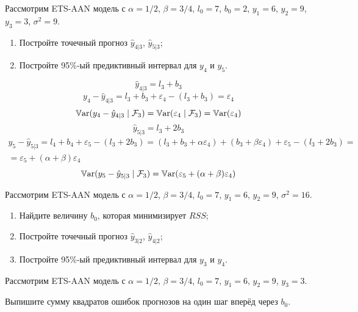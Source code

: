 \begin{problem}
  Рассмотрим ETS-AAN модель с $\alpha = 1/2$, $\beta=3/4$, $l_{0}=7$, $b_0=2$, $y_1=6$, $y_2=9$, $y_3=3$, $\sigma^2=9$.
  \begin{enumerate}
    \item Постройте точечный прогноз $\hat y_{4|3}$, $\hat y_{5|3}$;
    \item Постройте 95\%-ый предиктивный интервал для $y_{4}$ и $y_{5}$.
  \end{enumerate}
\begin{sol}
\[
\hat y_{4|3} = l_3 + b_3
\]
\[
y_4 - \hat y_{4|3} = l_3 + b_3 + \varepsilon_4 - (l_3 + b_3) = \varepsilon_4  
\]
\[
\operatorname{\mathbb{V}\mathrm{ar}}(y_4 - \hat y_{4|3} \mid \mathcal{F}_3) = \operatorname{\mathbb{V}\mathrm{ar}}(\varepsilon_4 \mid \mathcal{F}_3) = \operatorname{\mathbb{V}\mathrm{ar}}(\varepsilon_4)  
\]
\[
\hat y_{5|3} = l_3 + 2b_3
\]
\begin{multline}
y_5 - \hat y_{5|3} = l_4 + b_4 + \varepsilon_5 - (l_3 + 2b_3) = (l_3 + b_3 + \alpha \varepsilon_4)  + 
(b_3 + \beta \varepsilon_4) + \varepsilon_5 - (l_3 + 2b_3) = \\
= \varepsilon_5 + (\alpha + \beta) \varepsilon_4 
\end{multline}
\[
\operatorname{\mathbb{V}\mathrm{ar}}(y_5 - \hat y_{5|3} \mid \mathcal{F}_3) = \operatorname{\mathbb{V}\mathrm{ar}}(\varepsilon_5 + (\alpha + \beta) \varepsilon_4 )  
\]
\end{sol}
\end{problem}

\begin{problem}
  Рассмотрим ETS-AAN модель с $\alpha = 1/2$, $\beta=3/4$, $l_{0}=7$, $y_1=6$, $y_2=9$, $\sigma^2=16$.


  \begin{enumerate}
    \item Найдите величину $b_0$, которая минимизирует $RSS$;
    \item Постройте точечный прогноз $\hat y_{3|2}$, $\hat y_{4|2}$;
     \item Постройте 95\%-ый предиктивный интервал для $y_{3}$ и $y_{4}$.
  \end{enumerate}
\begin{sol}
\end{sol}
\end{problem}

\begin{problem}
  Рассмотрим ETS-AAN модель с $\alpha = 1/2$, $\beta=3/4$, $l_{0}=7$, $y_1=6$, $y_2=9$, $y_3=3$.

  Выпишите сумму квадратов ошибок прогнозов на один шаг вперёд через $b_0$.
\begin{sol}
\end{sol}
\end{problem}



